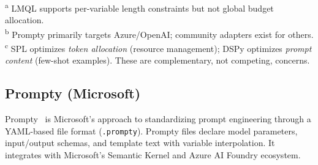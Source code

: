 \documentclass[11pt,a4paper]{article}
\begin{document}
\begin{table}[h]
\centering
\caption{Feature comparison of LLM prompt management approaches.}
\label{tab:comparison}

\smallskip
\textsuperscript{a} LMQL supports per-variable length constraints but not global budget allocation. \\
\textsuperscript{b} Prompty primarily targets Azure/OpenAI; community adapters exist for others. \\
\textsuperscript{c} SPL optimizes \emph{token allocation} (resource management); DSPy optimizes \emph{prompt content} (few-shot examples). These are complementary, not competing, concerns.
\end{table}

\subsection{Prompty (Microsoft)}

Prompty~\citep{prompty2024} is Microsoft's approach to standardizing prompt engineering through a YAML-based file format (\texttt{.prompty}). Prompty files declare model parameters, input/output schemas, and template text with variable interpolation. It integrates with Microsoft's Semantic Kernel and Azure AI Foundry ecosystem.
\end{document}
